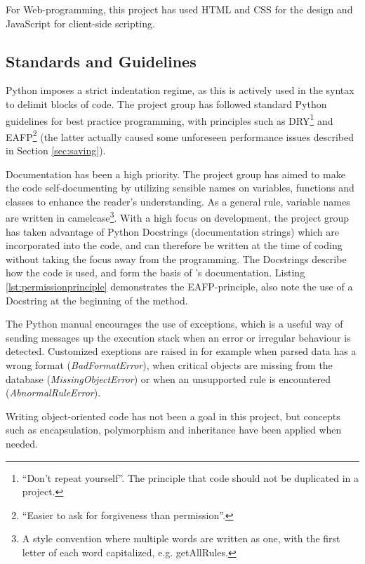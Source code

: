 For Web-programming, this project has used HTML and CSS for the design and
JavaScript for client-side scripting.

\subsection{Standards and Guidelines}
Python imposes a strict indentation regime, as this is actively used in the
syntax to delimit blocks of code. The project group has followed standard Python
guidelines for best practice programming, with principles such as
DRY\footnote{``Don't repeat yourself''. The principle that code should not be duplicated in a
project.} and EAFP\footnote{``Easier to ask for forgiveness than permission''.}
(the latter actually caused some unforeseen performance issues described in
Section \ref{sec:saving}).

Documentation has been a high priority. The project group has aimed to make the
code self-documenting by utilizing sensible names on variables, functions and
classes to enhance the reader's understanding. As a general rule, variable names
are written in camelcase\footnote{A style convention where multiple words are
written as one, with the first letter of each word capitalized, e.g.
getAllRules.}. With a high focus on development, the project group has taken
advantage of Python Docstrings \cite{pep257} (documentation strings) which are
incorporated into the code, and can therefore be written at the time of coding
without taking the focus away from the programming. The Docstrings describe how
the code is used, and form the basis of \snowman{}'s documentation. Listing
\ref{lst:permissionprinciple} demonstrates the EAFP-principle, also note the use
of a Docstring at the beginning of the method.

The Python manual encourages the use of exceptions, which is a useful way of
sending messages up the execution stack when an error or irregular behaviour is
detected. Customized exeptions are raised in \snowman{} for example when parsed
data has a wrong format ({\em BadFormatError}), when critical objects are
missing from the database ({\em MissingObjectError}) or when an unsupported
rule is encountered ({\em AbnormalRuleError}).

Writing object-oriented code has not been a goal in this project, but concepts
such as encapsulation, polymorphism and inheritance have been applied when
needed.

